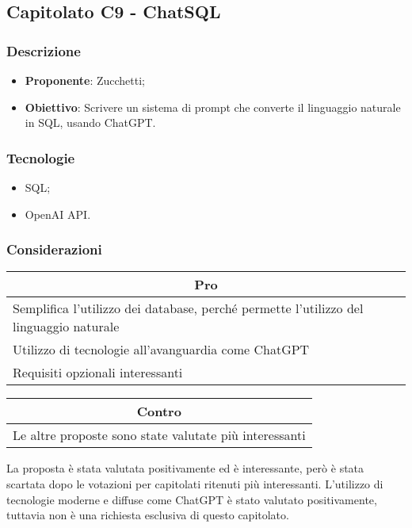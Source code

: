 \subsection{Capitolato C9 - ChatSQL}


\subsubsection{Descrizione}
\begin{itemize}
    \item \textbf{Proponente}: Zucchetti;
    \item \textbf{Obiettivo}: Scrivere un sistema di prompt che converte il 
	linguaggio naturale in SQL, usando ChatGPT.
\end{itemize}


\subsubsection{Tecnologie}
\begin{itemize}
    \item SQL;
    \item OpenAI API.
\end{itemize}


\subsubsection{Considerazioni}
\begin{minipage}[t]{0.45\linewidth}
    \vspace{0pt}
    {\renewcommand{\arraystretch}{1.5}
    \begin{tabular}{p{1\linewidth}}
        \multicolumn{1}{c}{\textbf{Pro}} \\
        \midrule
        Semplifica l'utilizzo dei database, perché permette l'utilizzo del
		linguaggio naturale \\
        Utilizzo di tecnologie all'avanguardia come ChatGPT \\
        Requisiti opzionali interessanti \\
        \hline
    \end{tabular}
    }
\end{minipage}
\hspace{0.05\linewidth}
\begin{minipage}[t]{0.45\linewidth}
    \vspace{0pt}
    {\renewcommand{\arraystretch}{1.5}
    \begin{tabular}{p{1\linewidth}}
        \multicolumn{1}{c}{\textbf{Contro}} \\
        \midrule
		Le altre proposte sono state valutate più interessanti \\
        \hline
    \end{tabular}
    }
\end{minipage}
\vspace{1em}

La proposta è stata valutata positivamente ed è interessante, però è stata 
scartata dopo le votazioni per capitolati ritenuti più interessanti.
L'utilizzo di tecnologie moderne e diffuse come ChatGPT è stato valutato 
positivamente, tuttavia non è una richiesta esclusiva di questo capitolato.
